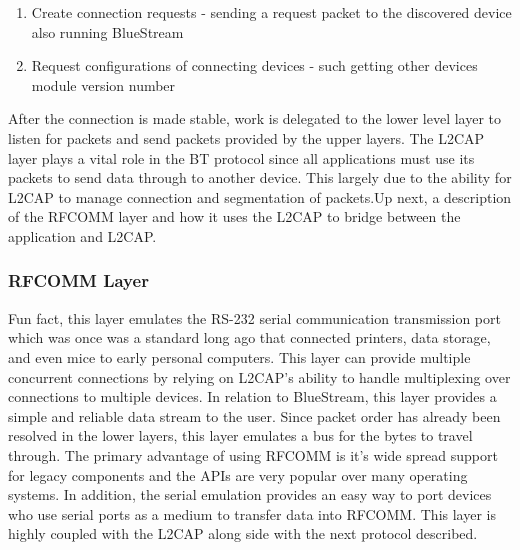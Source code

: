 \documentclass[a4paper,12pt]{article}
\begin{document}
\begin{enumerate}
\item Create connection requests - sending a request packet to the discovered device also running BlueStream
\item Request configurations of connecting devices - such getting other devices module version number
\end{enumerate}

After the connection is made stable, work is delegated to the lower level layer to listen for packets and send packets provided by the upper layers. The L2CAP layer plays a vital role in the BT protocol since all applications must use its packets to send data through to another device. This largely due to the ability for L2CAP to manage connection and segmentation of packets.Up next, a description of the RFCOMM layer and how it uses the L2CAP to bridge between the application and L2CAP. 

\subsubsection{RFCOMM Layer}
Fun fact, this layer emulates the RS-232 serial communication transmission port which was once was a standard long ago that connected printers, data storage, and even mice to early personal computers. This layer can provide multiple concurrent connections by relying on L2CAP’s ability to handle multiplexing over connections to multiple devices. In relation to BlueStream, this layer provides a simple and reliable data stream to the user. Since packet order has already been resolved in the lower layers, this layer emulates a bus for the bytes to travel through. The primary advantage of using RFCOMM is it’s wide spread support for legacy components and the APIs are very popular over many operating systems. In addition, the serial emulation provides an easy way to port devices who use serial ports as a medium to transfer data into RFCOMM. This layer is highly coupled with the L2CAP along side with the next protocol described. 
\end{document}
